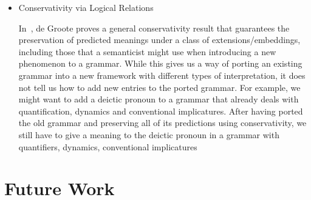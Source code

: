 \begin{itemize}
  In our thesis, instead of going this road, we build a composite (free)
  monad. We do so because of two reasons. First, our investigations are
  motivated by the search for a wide-coverage abstract categorial grammar
  (ACG) with formal semantics. In ACGs, derivations are expressed in an
  abstract grammar, which intuitively corresponds to a level of deep
  syntax. Using a similar approach would force us to introduce semantic
  types into the level of abstract syntax. Furthermore, the logic which
  licences derivations would need to be extended to include monadic types
  (i.e.\ we would need to add modalities to the implicative fragment of
  linear logic used in ACGs), which means we would risk losing the existing
  ACG meta-theory, such as parsing results. Second, the point of using
  $\calc$ is to deal with ``non-compositional'' phenomena in a
  compositional setting. If we rearrange the deep syntax so as to
  facilitate composition, then we could be considered
  cheating.\footnote{Though when it comes to ``non-compositional''
    phenomena, cheating compositionality might actually be the
    methodologically sound approach.}

\item Conservativity via Logical
  Relations~\cite{degroote2015conservativity}

  In~\cite{degroote2015conservativity}, de Groote proves a general
  conservativity result that guarantees the preservation of predicted
  meanings under a class of extensions/embeddings, including those that a
  semanticist might use when introducing a new phenomenon to a
  grammar. While this gives us a way of porting an existing grammar into a
  new framework with different types of interpretation, it does not tell us
  how to add new entries to the ported grammar. For example, we might want
  to add a deictic pronoun to a grammar that already deals with
  quantification, dynamics and conventional implicatures. After having
  ported the old grammar and preserving all of its predictions using
  conservativity, we still have to give a meaning to the deictic pronoun in
  a grammar with quantifiers, dynamics, conventional implicatures
 
\end{itemize}


\section{Future Work}
\label{sec:future-work}
